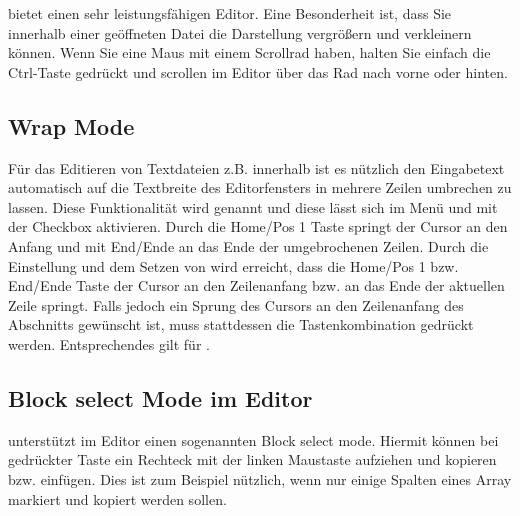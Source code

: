 \codeblocks bietet einen sehr leistungsfähigen Editor. Eine Besonderheit ist, dass Sie innerhalb einer geöffneten Datei die Darstellung vergrößern und verkleinern können. Wenn Sie eine Maus mit einem Scrollrad haben, halten Sie einfach die Ctrl-Taste gedrückt und scrollen im Editor über das Rad nach vorne oder hinten.


\subsection{Wrap Mode}

Für das Editieren von Textdateien z.B.  innerhalb \codeblocks ist es nützlich den Eingabetext automatisch auf die Textbreite des Editorfensters in mehrere Zeilen umbrechen zu lassen. Diese Funktionalität wird  genannt und diese lässt sich im Menü  und mit der Checkbox  aktivieren. Durch die Home/Pos 1 Taste springt der Cursor an den Anfang und mit End/Ende an das Ende der umgebrochenen Zeilen. Durch die Einstellung  und dem Setzen von  wird erreicht, dass die Home/Pos 1 bzw. End/Ende Taste der Cursor an den Zeilenanfang bzw. an das Ende der aktuellen Zeile springt. Falls jedoch ein Sprung des Cursors an den Zeilenanfang des Abschnitts gewünscht ist, muss stattdessen die Tastenkombination  gedrückt werden. Entsprechendes gilt für .

\subsection{Block select Mode im Editor}

\codeblocks unterstützt im Editor einen sogenannten Block select mode. Hiermit können bei gedrückter  Taste ein Rechteck mit der linken Maustaste aufziehen und kopieren bzw. einfügen. Dies ist zum Beispiel nützlich, wenn nur einige Spalten eines Array markiert und kopiert werden sollen.


